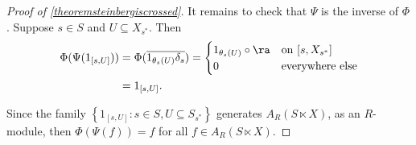 \begin{proof}[Proof of \ref{theoremsteinbergiscrossed}]
%
It remains to check that $\Psi$ is the inverse of $\Phi$. Suppose $s\in S$ and $U\subseteq X_{s^*}$. Then
\begin{align*}
\Phi(\Psi(1_{[s,U]}))&=\Phi(\overline{1_{\theta_s(U)}\delta_s})=\begin{cases}
1_{\theta_s(U)}\circ\ra&\text{on }[s,X_{s^*}]\\
0&\text{everywhere else}
\end{cases}\\
&=1_{[s,U]}.
\end{align*}

Since the family  $\left\{1_{[s,U]}:s\in S, U\subseteq S_{s^*}\right\}$ generates $A_R(S\ltimes X)$, as an $R$-module, then $\Phi(\Psi(f))=f$ for all $f\in A_R(S\ltimes X)$.


\end{proof}
